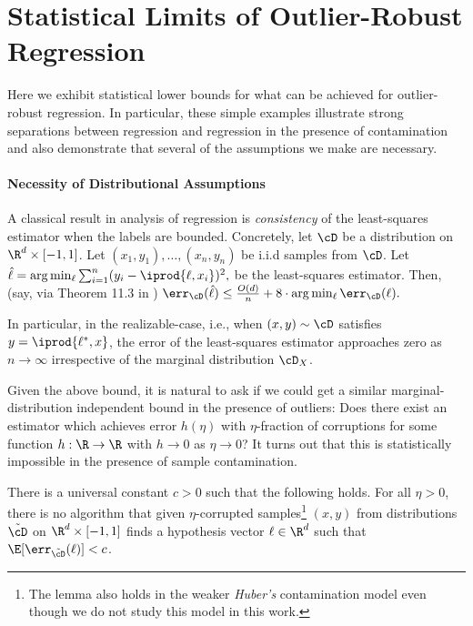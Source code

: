 

\section{Statistical Limits of Outlier-Robust Regression}
\label{sec:lower-bounds}
Here we exhibit statistical lower bounds for what can be achieved for outlier-robust regression. In particular, these simple examples illustrate strong separations between regression and regression in the presence of contamination and also demonstrate that several of the assumptions we make are necessary. 


\paragraph{Necessity of Distributional Assumptions}
A classical result in analysis of regression is \emph{consistency} of the least-squares estimator when the labels are bounded. Concretely, let $\cD$ be a distribution on $\R^d \times [-1,1]$. Let $(x_1,y_1),\ldots,(x_n,y_n)$ be i.i.d samples from $\cD$. Let 
$\hat{\ell} = \arg\min_{\ell} \sum_{i=1}^n (y_i - \iprod{\ell,x_i})^2,$
be the least-squares estimator. Then, (say, via Theorem 11.3 in \cite{DBLP:books/daglib/0035701}) %
$\err_{\cD}(\hat{\ell}) \leq \frac{O(d)}{n} + 8 \cdot \arg\min_{\ell}\err_{\cD}(\ell).$

In particular, in the realizable-case, i.e., when $(x,y) \sim \cD$ satisfies $y = \iprod{\ell^*,x}$, the error of the least-squares estimator approaches zero as $n \rightarrow \infty$ irrespective of the marginal distribution $\cD_X$. 

Given the above bound, it is natural to ask if we could get a similar marginal-distribution independent bound in the presence of outliers: Does there exist an estimator which achieves error $h(\eta)$ with $\eta$-fraction of corruptions for some function $h:\R \to \R$ with $h \rightarrow 0$ as $\eta \rightarrow 0$? It turns out that this is statistically impossible in the presence of sample contamination.
\begin{lemma}\label{lm:lb1}
There is a universal constant $c > 0$ such that the following holds. For all $\eta > 0$, there is no algorithm that given $\eta$-corrupted samples\footnote{The lemma also holds in the weaker \emph{Huber's} contamination model even though we do not study this model in this work.} $(x,y)$ from distributions $\tilde{\cD}$ on $\R^d \times [-1,1]$ finds a hypothesis vector $\ell \in \R^d$ such that $\E[\err_{\tilde{\cD}}(\ell)] < c$. 
\end{lemma}

